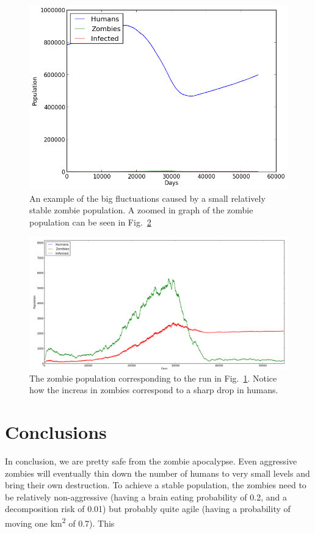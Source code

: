 \documentclass{report}
\begin{document}
\begin{figure}
\includegraphics[width=350pt]{plots/zombiesstable}
\caption{An example of the big fluctuations caused by a small relatively stable zombie population. A zoomed in graph of the zombie population can be seen in Fig.~\ref{zombiesstablezoomed}}
\label{zombiesstable}
\end{figure}
\begin{figure}
\includegraphics[width=350pt]{plots/zombiesstablezoomed}
\caption{The zombie population corresponding to the run in Fig.~\ref{zombiesstable}. Notice how the increas in zombies correspond to a sharp drop in humans.}
\label{zombiesstablezoomed}
\end{figure}




\section{Conclusions}
In conclusion, we are pretty safe from the zombie apocalypse. Even aggressive zombies will eventually thin down the number of humans to very small levels and bring their own destruction. To achieve a stable population, the zombies need to be relatively non-aggressive (having a brain eating probability of 0.2, and a decomposition risk of 0.01) but probably quite agile (having a probability of moving one km\textsuperscript{2} of 0.7). This
\end{document}
